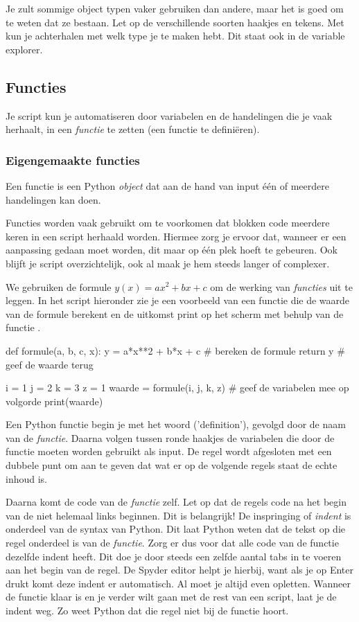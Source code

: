 \documentclass[a4paper,11pt, fleqn]{article}
\begin{document}
Je zult sommige object typen vaker gebruiken dan andere, maar het is goed om te weten dat ze bestaan. Let op de verschillende soorten haakjes en tekens. Met  kun je achterhalen met welk type je te maken hebt. Dit staat ook in de variable explorer.

\subsection{Functies}
Je script kun je automatiseren door variabelen en de handelingen die je vaak herhaalt, in een \textit{functie} te zetten (een functie te defini\"eren).

\subsubsection{Eigengemaakte functies}
Een functie is een Python \textit{object} dat aan de hand van input \'e\'en of meerdere handelingen kan doen.

Functies worden vaak gebruikt om te voorkomen dat blokken code meerdere keren in een script herhaald worden. 
Hiermee zorg je ervoor dat, wanneer er een aanpassing gedaan moet worden, dit maar op \'e\'en plek hoeft te gebeuren. 
Ook blijft je script overzichtelijk, ook al maak je hem steeds langer of complexer. 

We gebruiken de formule $y(x) = a x^2+b x + c$ om de werking van \textit{functies} uit te leggen. In het script hieronder zie je een voorbeeld van een functie die de waarde van de formule berekent en de uitkomst print op het scherm met behulp van de functie .

\begin{python}
def formule(a, b, c, x):
    y = a*x**2 + b*x + c	 # bereken de formule
    return y				 # geef de waarde terug

i = 1
j = 2
k = 3
z = 1
waarde = formule(i, j, k, z) # geef de variabelen mee op volgorde
print(waarde)
\end{python} 

Een Python functie begin je met het woord  ('definition'), gevolgd door de naam van de \textit{functie}. Daarna volgen tussen ronde haakjes de variabelen die door de functie moeten worden gebruikt als input. De regel wordt afgesloten met een dubbele punt om aan te geven dat wat er op de volgende regels staat de echte inhoud is. 

Daarna komt de code van de \textit{functie} zelf. Let op dat de regels code na het begin van de  niet helemaal links beginnen. Dit is belangrijk! De inspringing of \textit{indent} is onderdeel van de syntax van Python. Dit laat Python weten dat de tekst op die regel onderdeel is van de \textit{functie}. Zorg er dus voor dat alle code van de functie dezelfde indent heeft. Dit doe je door steeds een zelfde aantal tabs in te voeren aan het begin van de regel. De Spyder editor helpt je hierbij, want als je op Enter drukt komt deze indent er automatisch. Al moet je altijd even opletten. Wanneer de functie klaar is en je verder wilt gaan met de rest van een script, laat je de indent weg. Zo weet Python dat die regel niet bij de functie hoort.
\end{document}
